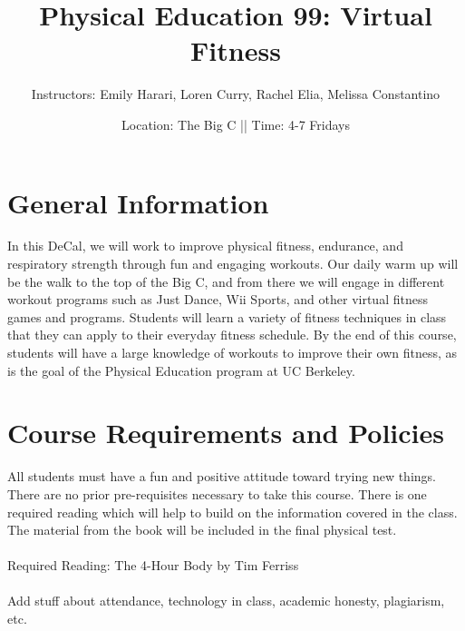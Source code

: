 \documentclass[letterpaper,12pt]{article}
\begin{document}
\title{Physical Education 99: Virtual Fitness}
\date{Location: The Big C || Time: 4-7 Fridays }
\author{Instructors: Emily Harari, Loren Curry, Rachel Elia, Melissa Constantino}
\maketitle

\section{General Information}



In this DeCal, we will work to improve physical fitness, endurance, and respiratory strength through fun and engaging workouts. Our daily warm up will be the walk to the top of the Big C, and from there we will engage in different workout programs such as Just Dance, Wii Sports, and other virtual fitness games and programs. Students will learn a variety of fitness techniques in class that they can apply to their everyday fitness schedule. By the end of this course, students will have a large knowledge of workouts to improve their own fitness, as is the goal of the Physical Education program at UC Berkeley.

\section{Course Requirements and Policies}

All students must have a fun and positive attitude toward trying new things. There are no prior pre-requisites necessary to take this course. There is one required reading which will help to build on the information covered in the class. The material from the book will be included in the final physical test.\\
\\
Required Reading: The 4-Hour Body by Tim Ferriss \\
\\
Add stuff about attendance, technology in class, academic honesty, plagiarism, etc.
\end{document}
